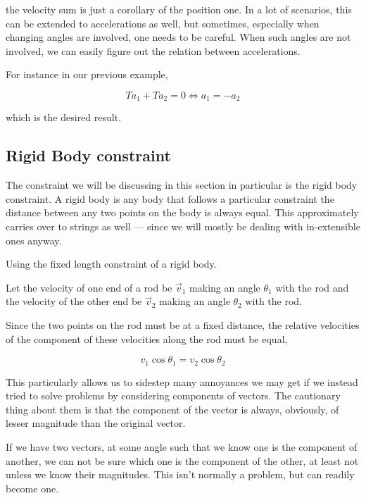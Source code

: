 the velocity sum is just a corollary of the position one. In a lot of scenarios, 
this can be extended to accelerations as well, but sometimes, especially when 
changing angles are involved, one needs to be careful. When such angles are not 
involved, we can easily figure out the relation between accelerations. 

For instance in our previous example,

\begin{equation*}
    Ta_1 + Ta_2 = 0 \iff a_1 = -a_2
\end{equation*}

which is the desired result.

\subsection{Rigid Body constraint}

The constraint we will be discussing in this section in particular is the rigid body constraint.
A rigid body is any body that follows a particular constraint the distance between
any two points on the body is always equal. This approximately carries over to 
strings as well --- since we will mostly be dealing with in-extensible ones anyway.

\begin{marginfigure}
    \caption{Using the fixed length constraint of a rigid body.}
\end{marginfigure}

Let the velocity of one end of a rod be \(\vec{v}_1\) making an angle \(\theta_1\) with the rod
and the velocity of the other end be \(\vec{v}_2\) making an angle \(\theta_2\) with the rod.

Since the two points on the rod must be at a fixed distance, the relative velocities of the
 component of these velocities along the rod must be equal,

 \begin{equation}
    \boxed{v_1\cos\theta_1 = v_2\cos\theta_2}
 \end{equation}

This particularly allows us to sidestep many annoyances we may get if we 
instead tried to solve problems by considering components of vectors. The cautionary thing 
about them is that the component of the vector is always, obviously, of lesser magnitude than 
the original vector.

If we have two vectors, at some angle such that we know one is the component of another, we
can not be sure which one is the component of the other, at least not unless we 
know their magnitudes. This isn't normally a problem, but can readily become one.

